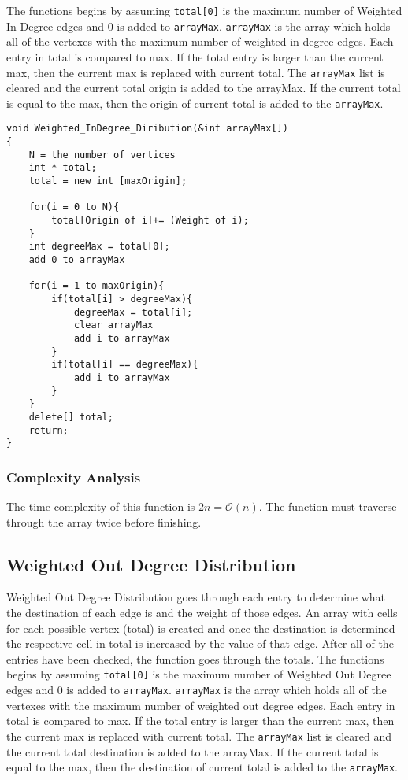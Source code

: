 \documentclass{article}
\begin{document}
The functions begins by assuming \texttt{total[0]} is the maximum number of Weighted In Degree edges and $0$ is added to \texttt{arrayMax}. \texttt{arrayMax} is the array which holds all of the vertexes with the maximum number of weighted in degree edges. Each entry in total is compared to max. If the total entry is larger than the current max, then the current max is replaced with current total. The \texttt{arrayMax} list is cleared and the current total origin is added to the arrayMax. If the current total is equal to the max, then the origin of current total is added to the \texttt{arrayMax}.

\begin{verbatim}
void Weighted_InDegree_Diribution(&int arrayMax[])
{
    N = the number of vertices
    int * total;
    total = new int [maxOrigin];

    for(i = 0 to N){
        total[Origin of i]+= (Weight of i);
    }
    int degreeMax = total[0];
    add 0 to arrayMax

    for(i = 1 to maxOrigin){
        if(total[i] > degreeMax){
            degreeMax = total[i];
            clear arrayMax
            add i to arrayMax
        }
        if(total[i] == degreeMax){
            add i to arrayMax
        }
    }
    delete[] total;
    return;
}
\end{verbatim}

\subsubsection{Complexity Analysis}
The time complexity of this function is $2n = \mathcal{O}(n)$. The function must traverse through the array twice before finishing.

\subsection{Weighted Out Degree Distribution}
Weighted Out Degree Distribution goes through each entry to determine what the destination of each edge is and the weight of those edges. An array with cells for each possible vertex (total) is created and once the destination is determined the respective cell in total is increased by the value of that edge. After all of the entries have been checked, the function goes through the totals. The functions begins by assuming \texttt{total[0]} is the maximum number of Weighted Out Degree edges and $0$ is added to \texttt{arrayMax}. \texttt{arrayMax} is the array which holds all of the vertexes with the maximum number of weighted out degree edges. Each entry in total is compared to max. If the total entry is larger than the current max, then the current max is replaced with current total. The \texttt{arrayMax} list is cleared and the current total destination is added to the arrayMax. If the current total is equal to the max, then the destination of current total is added to the \texttt{arrayMax}.
\end{document}
